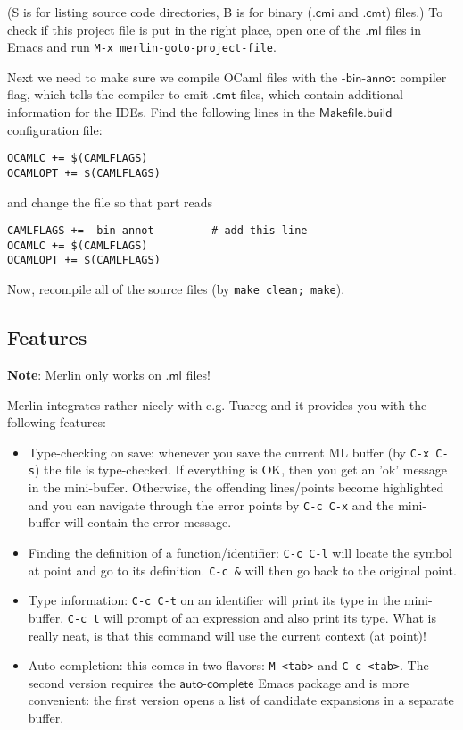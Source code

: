 \documentclass[a4paper,oneside]{book}
\newcommand{\m}[1]{\ensuremath{\mathsf{#1}}}
\begin{document}
(S is for listing source code directories, B is for binary (\m{.cmi}
and \m{.cmt}) files.) To check if this project file is put in the
right place, open one of the \m{.ml} files in Emacs and run
\verb|M-x merlin-goto-project-file|.

Next we need to make sure we compile OCaml files with the
-\m{bin}-\m{annot} compiler flag, which tells the compiler to emit
\m{.cmt} files, which contain additional information for the
IDEs. Find the following lines in the \m{Makefile.build} configuration
file:

\begin{lstlisting}
OCAMLC += $(CAMLFLAGS)
OCAMLOPT += $(CAMLFLAGS)
\end{lstlisting}

and change the file so that part reads

\begin{lstlisting}
CAMLFLAGS += -bin-annot         # add this line
OCAMLC += $(CAMLFLAGS)
OCAMLOPT += $(CAMLFLAGS)
\end{lstlisting}

Now, recompile all of the source files (by \verb|make clean; make|).

\subsection{Features}

\textbf{Note}: Merlin only works on \m{.ml} files!

\noindent
Merlin integrates rather nicely with e.g. Tuareg and it provides you
with the following features:

\begin{itemize}
\item Type-checking on save: whenever you save the current ML buffer
  (by \verb|C-x C-s|) the file is type-checked. If everything is OK,
  then you get an 'ok' message in the mini-buffer. Otherwise, the
  offending lines/points become highlighted and you can navigate
  through the error points by \verb|C-c C-x| and the mini-buffer will
  contain the error message.
\item Finding the definition of a function/identifier: \verb|C-c C-l|
  will locate the symbol at point and go to its
  definition. \verb|C-c &| will then go back to the original point.
\item Type information: \verb|C-c C-t| on an identifier will print its
  type in the mini-buffer. \verb|C-c t| will prompt of an expression
  and also print its type. What is really neat, is that this command
  will use the current context (at point)!
\item Auto completion: this comes in two flavors: \verb|M-<tab>| and
  \verb|C-c <tab>|. The second version requires the
  \m{auto}-\m{complete} Emacs package and is more convenient: the
  first version opens a list of candidate expansions in a separate
  buffer.
\end{itemize}
\end{document}
